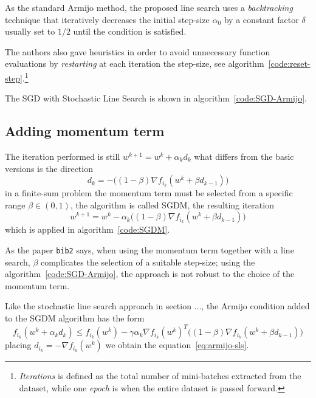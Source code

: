 As the standard Armijo method, the proposed line search uses a \emph{backtracking} technique that iteratively decreases the initial step-size $\alpha_0$ by a constant factor $\delta$ usually set to $1/2$ until the condition is satisfied.

The authors also gave heuristics in order to avoid unnecessary function evaluations by \emph{restarting} at each iteration the step-size, see algorithm~\vref{code:reset-step}.\footnote{\emph{Iterations} is defined as the total number of mini-batches extracted from the dataset, while one \emph{epoch} is when the entire dataset is passed forward.}

The SGD with Stochastic Line Search is shown in algorithm~\vref{code:SGD-Armijo}.

\subsection{Adding momentum term}

The iteration performed is still $w^{k+1}=w^k+\alpha_kd_k$ what differs from the basic versions is the direction
\[
d_k=-\bigl((1-\beta)\nabla f_{i_k}(w^k+\beta d_{k-1})\bigr)
\]
in a finite-sum problem the momentum term must be selected from a specific range $\beta\in(0,1)$, the algorithm is called SGDM, the resulting iteration
\begin{equation}\label{eq:sgdm-step}
w^{k+1}=w^k-\alpha_k\bigl((1-\beta)\nabla f_{i_k}(w^k+\beta d_{k-1})\bigr)
\end{equation}
which is applied in algorithm~\vref{code:SGDM}.

As the paper \texttt{bib2} says, when using the momentum term together with a line search, $\beta$ complicates the selection of a suitable step-size; using the algorithm~\ref{code:SGD-Armijo}, the approach is not robust to the choice of the momentum term.

Like the stochastic line search approach in section ..., the Armijo condition added to the SGDM algorithm has the form
\begin{equation}\label{eq:armijo-sgdm}
f_{i_k}(w^k+\alpha_kd_k)\leq f_{i_k}(w^k)-\gamma\alpha_k\nabla f_{i_k}(w^k)^T\bigl((1-\beta)\nabla f_{i_k}(w^k+\beta d_{k-1})\bigr)
\end{equation}
placing $d_{i_k}=-\nabla f_{i_k}(w^k)$ we obtain the equation~\eqref{eq:armijo-sls}.

